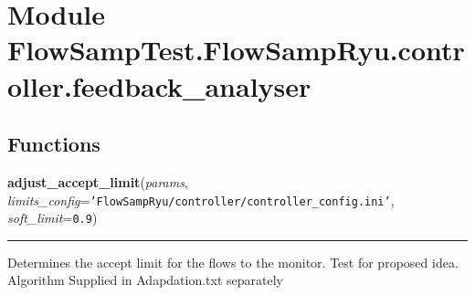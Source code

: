 %
%
%


\section{Module FlowSampTest.FlowSampRyu.controller.feedback\_analyser}

    \label{FlowSampTest:FlowSampRyu:controller:feedback_analyser}


  \subsection{Functions}

    \label{FlowSampTest:FlowSampRyu:controller:feedback_analyser:adjust_accept_limit}

    \vspace{0.5ex}

\hspace{.8\funcindent}\begin{boxedminipage}{\funcwidth}

    \raggedright \textbf{adjust\_accept\_limit}(\textit{params}, \textit{limits\_config}={\tt \texttt{'}\texttt{FlowSampRyu/controller/controller\_config.ini}\texttt{'}}, \textit{soft\_limit}={\tt 0.9})

    \vspace{-1.5ex}

    \rule{\textwidth}{0.5\fboxrule}
\setlength{\parskip}{2ex}
    Determines the accept limit for the flows to the monitor. Test for 
    proposed idea. Algorithm Supplied in Adapdation.txt separately

\setlength{\parskip}{1ex}
    \end{boxedminipage}


